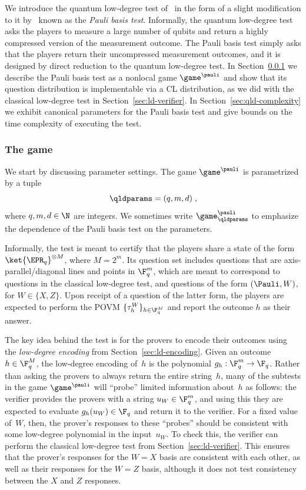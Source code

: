 We introduce the quantum low-degree test of~\cite{natarajan2018low} in the form
of a slight modification to it by~\cite{NW19} known as the \emph{Pauli basis
  test}.
Informally, the quantum low-degree test asks the players to measure a large
number of qubits and return a highly compressed version of the measurement
outcome.
The Pauli basis test simply asks that the players return their uncompressed
measurement outcomes, and it is designed by direct reduction to the quantum
low-degree test.
In Section~\ref{sec:qld-game} we describe the Pauli basis test as a nonlocal
game $\game^\pauli$ and show that its question distribution is implementable via
a CL distribution, as we did with the classical low-degree test in
Section~\ref{sec:ld-verifier}.
In Section~\ref{sec:qld-complexity} we exhibit canonical parameters for the
Pauli basis test and give bounds on the time complexity of executing the test.

\subsubsection{The game}
\label{sec:qld-game}

We start by discussing parameter settings.
The game $\game^\pauli$ is parametrized by a tuple
\[\qldparams = (q,m,d)\;,\] where $q,m,d \in \N$ are integers. 
We sometimes write $\game^\pauli_\qldparams$ to emphasize the dependence of the
Pauli basis test on the parameters.

Informally, the test is meant to certify that the players share a state of the
form $\ket{\EPR_q}^{\otimes M}$, where $M=2^m$.
Its question set includes questions that are axis-parallel/diagonal lines and points in $\F_q^m$,
which are meant to correspond to questions in the classical low-degree test, and questions
of the form $(\Pauli, W)$, for $W \in \{X, Z\}$.
Upon receipt of a question of the latter form, the players are expected to
perform the POVM $\{\tau_h^W\}_{h \in \F_q^{M}}$ and report the outcome $h$ as
their answer.

The key idea behind the test
is for the provers to encode their outcomes using the \emph{low-degree encoding} from Section~\ref{sec:ld-encoding}.
Given an outcome $h \in \F_q^M$, the low-degree encoding of~$h$ is the polynomial $g_h:\F_q^m \rightarrow \F_q$.
Rather than asking the provers to always return the entire string~$h$,
many of the subtests in the game $\game^\pauli$ will ``probe'' limited information about~$h$ as follows:
the verifier provides the provers with a string $u_W \in \F_q^m$,
and using this they are expected to evaluate $g_h(u_W) \in \F_q$ and return it to the verifier.
For a fixed value of~$W$, then, the prover's responses to these ``probes'' should be consistent with some low-degree polynomial in the input~$u_W$.
To check this, the verifier can perform the classical low-degree test from Section~\ref{sec:ld-verifier}.
This ensures that the prover's responses for the $W = X$ basis are consistent with each other,
as well as their responses for the $W = Z$ basis, although it does not test consistency between the $X$ and $Z$ responses.

